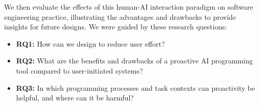  We then evaluate the effects of this human-AI interaction paradigm on software engineering practice, illustrating the advantages and drawbacks to provide insights for future designs. We were guided by these research questions:
\begin{itemize}
    \item \textbf{RQ1:} How can we design  to reduce user effort?
    \item \textbf{RQ2:} What are the benefits and drawbacks of a proactive AI programming tool compared to user-initiated systems?
    \item \textbf{RQ3:} In which programming processes and task contexts can proactivity be helpful, and where can it be harmful?
\end{itemize}

